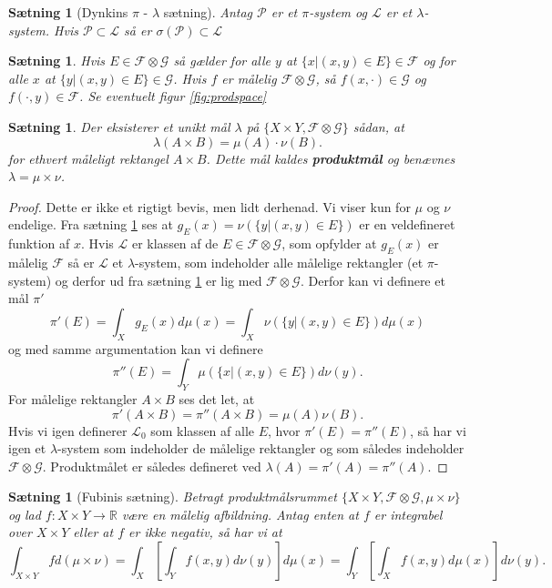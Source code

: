 \documentclass[12pt]{report}
\newtheorem{theorem}[lemma]{Sætning}
\theoremstyle{break}
\newtheorem*{proof}{Bevis}
\theoremstyle{break}
\newcommand{\RR}{\mathbb{R}}
\newcommand{\G}{\mathcal{G}}
\newcommand{\FI}{\mathcal{F}}
\newcommand{\PI}{\mathcal{P}}
\renewcommand{\L}{\mathcal{L}}
\newcommand{\1}{\mathds{1}}
\begin{document}
\begin{theorem}[Dynkins $\pi$ - $\lambda$ sætning]\label{th:dynkin}
	Antag $\PI$ er et $\pi$-system og $\L$ er et $\lambda$-system. Hvis $\PI \subset \L$ så er $\sigma(\PI)\subset\L$
\end{theorem}
\begin{theorem}\label{th:s2}
	Hvis $E\in \FI \otimes \G$ så gælder for alle $y$ at $\{ x|(x,y)\in E \}\in \FI$ og for alle $x$ at $\{ y|(x,y)\in E \}\in \G$. Hvis $f$ er målelig $\FI \otimes \G$, så $f(x,\cdot)\in \G$ og $f(\cdot,y)\in \FI$. Se eventuelt figur \ref{fig:prodspace}
\end{theorem}
\begin{theorem}
	Der eksisterer et unikt mål $\lambda$ på $\{ X \times Y, \FI \otimes \G \}$ sådan, at
	\[ \lambda(A\times B)=\mu(A)\cdot\nu(B). \]
	for ethvert måleligt rektangel $A \times B$. Dette mål kaldes {\bf produktmål} og benævnes $\lambda=\mu\times\nu$.
\end{theorem}
\begin{proof}
	Dette er ikke et rigtigt bevis, men lidt derhenad. Vi viser kun for $\mu$ og $\nu$ endelige. Fra sætning \ref{th:s2} ses at $g_E(x)=\nu (\{ y|(x,y)\in E \})$ er en veldefineret funktion af $x$. Hvis $\L$ er klassen af de $E\in \FI \otimes \G$, som opfylder at $g_E(x)$ er målelig $\FI$ så er $\L$ et $\lambda$-system, som indeholder alle målelige rektangler (et $\pi$-system) og derfor ud fra sætning \ref*{th:dynkin} er lig med $\FI \otimes \G$. Derfor kan vi definere et mål $\pi'$
	\[ \pi'(E)=\int_X g_E(x)d\mu(x)=\int_X \nu(\{ y|(x,y)\in E \})d\mu(x) \]
	og med samme argumentation kan vi definere
	\[ \pi''(E)=\int_Y \mu(\{ x|(x,y)\in E \})d\nu(y). \]
	For målelige rektangler $A\times B$ ses det let, at
	\[ \pi'(A\times B) = \pi''(A\times B) = \mu(A)\nu(B). \]
	Hvis vi igen definerer $\L_0$ som klassen af alle $E$, hvor $\pi'(E) =\pi''(E)$, så har vi igen et $\lambda$-system som indeholder de målelige rektangler og som således indeholder $\FI \otimes \G$. Produktmålet er således defineret ved $\lambda(A)=\pi'(A)=\pi''(A)$.
\end{proof}
\begin{theorem}[Fubinis sætning]
	Betragt produktmålsrummet $\{ X\times Y, \FI \otimes \G,\mu \times \nu \}$ og lad $f\colon X\times Y\to \RR$ være en målelig afbildning. Antag enten at $f$ er integrabel over $X\times Y$ eller at $f$ er ikke negativ, så har vi at
	\[ \int_{X\times Y}fd(\mu \times \nu)=\int_X \left[ \int_Y f(x,y)d\nu(y) \right]d\mu(x)=\int_Y\left[ \int_X f(x,y)d\mu(x) \right]d\nu(y). \]
\end{theorem}
\end{document}
